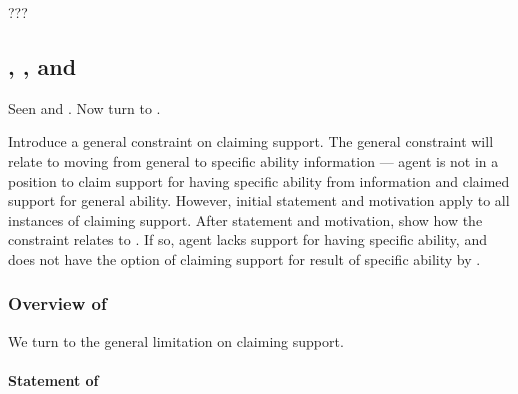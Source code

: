 \begin{note}[Summarising]
  ???
\end{note}

\subsection{\nI{}, \gsi{}, and }
\label{sec:second-conditional}

\begin{note}
  Seen \ESU{} and \ur{}.
  Now turn to \nr{}.
\end{note}

\begin{note}
  Introduce a general constraint on claiming support.
  The general constraint will relate to moving from general to specific ability information --- agent is not in a position to claim support for having specific ability from information and claimed support for general ability.
  However, initial statement and motivation apply to all instances of claiming support.
  After statement and motivation, show how the constraint relates to \nr{}.
  If so, agent lacks support for having specific ability, and does not have the option of claiming support for result of specific ability by \nr{}.
\end{note}

\subsubsection{Overview of \nI{}}
\label{sec:ni-1}

\begin{note}
  We turn to the general limitation on claiming support.
\end{note}

\paragraph{Statement of \nI{}}

